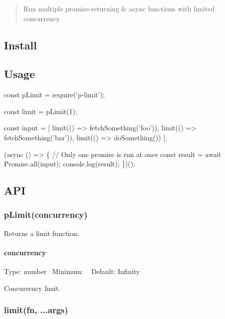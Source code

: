 \begin{quote}
Run multiple promise-\/returning \& async functions with limited concurrency \end{quote}


\subsection*{Install}




\subsection*{Usage}


\begin{DoxyCode}
const pLimit = require('p-limit');

const limit = pLimit(1);

const input = [
    limit(() => fetchSomething('foo')),
    limit(() => fetchSomething('bar')),
    limit(() => doSomething())
];

(async () => \{
    // Only one promise is run at once
    const result = await Promise.all(input);
    console.log(result);
\})();
\end{DoxyCode}


\subsection*{A\+PI}

\subsubsection*{p\+Limit(concurrency)}

Returns a {\ttfamily limit} function.

\paragraph*{concurrency}

Type\+: {\ttfamily number}~\newline
 Minimum\+: {}~\newline
 Default\+: {\ttfamily Infinity}

Concurrency limit.

\subsubsection*{limit(fn, ...args)}

